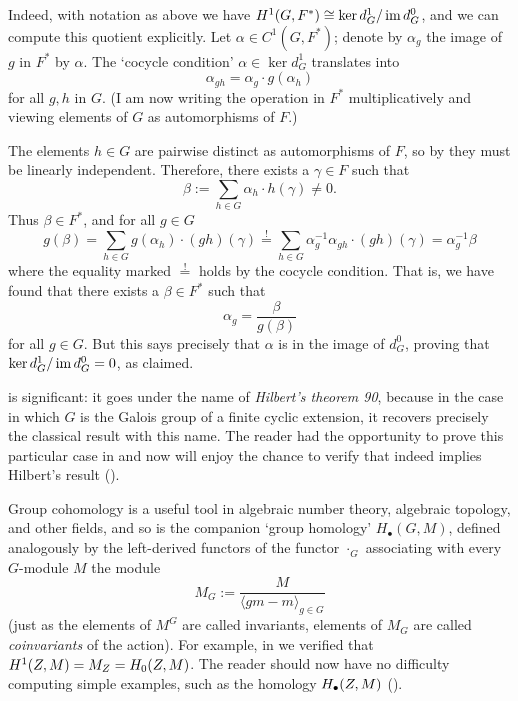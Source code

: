 Indeed, with notation as above we have
$H^1(G, F^*) \cong \ker d_G^1 / \operatorname{im} d_G^0$, and we can compute this
quotient explicitly. Let $\alpha \in C^1(G, F^*)$; denote by
$\alpha_g$ the image of $g$ in $F^*$ by $\alpha$. The `cocycle
condition' $\alpha \in \ker d_G^1$ translates into
\[
  \alpha_{gh} = \alpha_g \cdot g(\alpha_h)
\]
for all $g, h$ in $G$. (I am now writing the operation in $F^*$
multiplicatively and viewing elements of $G$ as automorphisms of $F$.)

The elements $h \in G$ are pairwise distinct as automorphisms of $F$,
so by 
they must be linearly independent.  Therefore, there exists a
$\gamma \in F$ such that
\[
  \beta := \sum_{h \in G} \alpha_h \cdot h(\gamma) \ne 0.
\]
Thus $\beta \in F^*$, and for all $g \in G$
\[
  g(\beta) = \sum_{h \in G} g(\alpha_h) \cdot (gh)(\gamma)
  \overset{!}{=} \sum_{h \in G} \alpha_g^{-1} \alpha_{gh} \cdot
  (gh)(\gamma) = \alpha_g^{-1} \beta
\]
where the equality marked $\overset{!}{=}$ holds by the cocycle
condition. That is, we have found that there exists a $\beta \in F^*$
such that
\[
  \alpha_g = \frac{\beta}{g(\beta)}
\]
for all $g \in G$. But this says precisely that $\alpha$ is in the
image of $d_G^0$, proving that $\ker d_G^1 / \operatorname{im} d_G^0 = 0$, as
claimed.

 is significant: it goes under the name of
\emph{Hilbert's theorem 90}, because in the case in which $G$ is the
Galois group of a finite cyclic extension, it recovers precisely the
classical result with this name. The reader had the opportunity to
prove this particular case in
 and now will
enjoy the chance to verify that indeed 
implies Hilbert's result
().

Group cohomology is a useful tool in algebraic number theory,
algebraic topology, and other fields, and so is the companion `group
homology' $H_\bullet(G, M)$, defined analogously by the left-derived
functors of the functor $\cdot_G$ associating with every $G$-module
$M$ the module
\[
  M_G := \frac{M}{\langle gm - m \rangle_{g \in G}}
\]
(just as the elements of $M^G$ are called invariants, elements of
$M_G$ are called \emph{coinvariants} of the action). For example, in
 we verified that
$H^1(Z, M) = M_{Z} = H_0(Z, M)$. The reader should now have no
difficulty computing simple examples, such as the homology
$H_\bullet(Z, M)$
().

